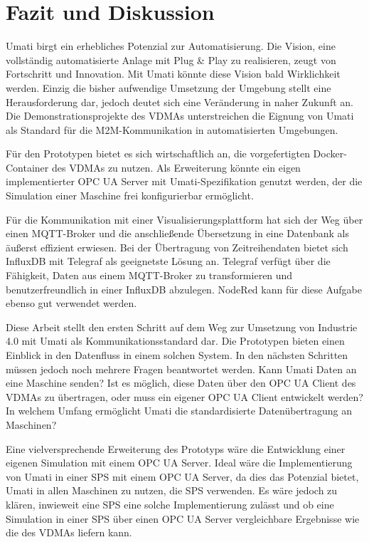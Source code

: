 \documentclass[a4paper, 12pt, oneside, toc=listofnumbered, bibliography=totoc]{scrbook}
\begin{document}
	\chapter{Fazit und Diskussion}\label{ch:Diskussion_Fazit}
	
		Umati birgt ein erhebliches Potenzial zur Automatisierung. Die Vision, eine vollständig automatisierte Anlage mit Plug \& Play zu realisieren, zeugt von Fortschritt und Innovation. Mit Umati könnte diese Vision bald Wirklichkeit werden. Einzig die bisher aufwendige Umsetzung der Umgebung stellt eine Herausforderung dar, jedoch deutet sich eine Veränderung in naher Zukunft an. Die Demonstrationsprojekte des VDMAs unterstreichen die Eignung von Umati als Standard für die M2M-Kommunikation in automatisierten Umgebungen.
		
		Für den Prototypen bietet es sich wirtschaftlich an, die vorgefertigten Docker-Container des VDMAs zu nutzen. Als Erweiterung könnte ein eigen implementierter OPC UA Server mit Umati-Spezifikation genutzt werden, der die Simulation einer Maschine frei konfigurierbar ermöglicht.
		
		Für die Kommunikation mit einer Visualisierungsplattform hat sich der Weg über einen MQTT-Broker und die anschließende Übersetzung in eine Datenbank als äußerst effizient erwiesen. Bei der Übertragung von Zeitreihendaten bietet sich InfluxDB mit Telegraf als geeignetste Lösung an. Telegraf verfügt über die Fähigkeit, Daten aus einem MQTT-Broker zu transformieren und benutzerfreundlich in einer InfluxDB abzulegen. NodeRed kann für diese Aufgabe ebenso gut verwendet werden.
		
		Diese Arbeit stellt den ersten Schritt auf dem Weg zur Umsetzung von Industrie 4.0 mit Umati als Kommunikationsstandard dar. Die Prototypen bieten einen Einblick in den Datenfluss in einem solchen System. In den nächsten Schritten müssen jedoch noch mehrere Fragen beantwortet werden. Kann Umati Daten an eine Maschine senden? Ist es möglich, diese Daten über den OPC UA Client des VDMAs zu übertragen, oder muss ein eigener OPC UA Client entwickelt werden? In welchem Umfang ermöglicht Umati die standardisierte Datenübertragung an Maschinen?
		
		Eine vielversprechende Erweiterung des Prototyps wäre die Entwicklung einer eigenen Simulation mit einem OPC UA Server. Ideal wäre die Implementierung von Umati in einer SPS mit einem OPC UA Server, da dies das Potenzial bietet, Umati in allen Maschinen zu nutzen, die SPS verwenden. Es wäre jedoch zu klären, inwieweit eine SPS eine solche Implementierung zulässt und ob eine Simulation in einer SPS über einen OPC UA Server vergleichbare Ergebnisse wie die des VDMAs liefern kann.
		
\end{document}
